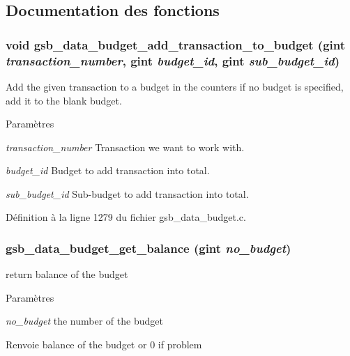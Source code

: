 \subsection{Documentation des fonctions}
\subsubsection[{gsb\_\-data\_\-budget\_\-add\_\-transaction\_\-to\_\-budget}]{\setlength{\rightskip}{0pt plus 5cm}void gsb\_\-data\_\-budget\_\-add\_\-transaction\_\-to\_\-budget (gint {\em transaction\_\-number}, \/  gint {\em budget\_\-id}, \/  gint {\em sub\_\-budget\_\-id})}\label{gsb__data__budget_8h_ac21b7a13604eb934237a2ef2ad426c50}
Add the given transaction to a budget in the counters if no budget is specified, add it to the blank budget.


\begin{DoxyParams}{Paramètres}
\item[{\em transaction\_\-number}]Transaction we want to work with. \item[{\em budget\_\-id}]Budget to add transaction into total. \item[{\em sub\_\-budget\_\-id}]Sub-\/budget to add transaction into total. \end{DoxyParams}


Définition à la ligne 1279 du fichier gsb\_\-data\_\-budget.c.

\subsubsection[{gsb\_\-data\_\-budget\_\-get\_\-balance}]{ gsb\_\-data\_\-budget\_\-get\_\-balance (gint {\em no\_\-budget})}\label{gsb__data__budget_8h_a74f736d36e08cf069bd829f082c40c7b}
return balance of the budget


\begin{DoxyParams}{Paramètres}
\item[{\em no\_\-budget}]the number of the budget\end{DoxyParams}
\begin{DoxyReturn}{Renvoie}
balance of the budget or 0 if problem 
\end{DoxyReturn}



